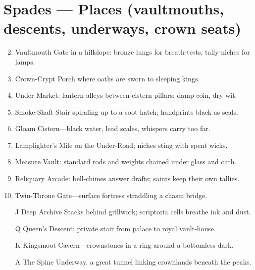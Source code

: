 \section{Spades --- Places (vaultmouths, descents, underways, crown seats)}
\label{sec:aeler-places}
\begin{enumerate}
\setcounter{enumi}{1}
\item Vaultmouth Gate in a hillslope: bronze lungs for breath-tests, tally-niches for lamps.
\item Crown-Crypt Porch where oaths are sworn to sleeping kings.
\item Under-Market: lantern alleys between cistern pillars; damp coin, dry wit.
\item Smoke-Shaft Stair spiraling up to a soot hatch; handprints black as seals.
\item Gloam Cistern---black water, lead scales, whispers carry too far.
\item Lamplighter's Mile on the Under-Road; niches sting with spent wicks.
\item Measure Vault: standard rods and weights chained under glass and oath.
\item Reliquary Arcade: bell-chimes answer drafts; saints keep their own tallies.
\item Twin-Throne Gate---surface fortress straddling a chasm bridge.
\item[J] Deep Archive Stacks behind grillwork; scriptoria cells breathe ink and dust.
\item[Q] Queen's Descent: private stair from palace to royal vault-house.
\item[K] Kingsmoot Cavern---crownstones in a ring around a bottomless dark.
\item[A] The Spine Underway, a great tunnel linking crownlands beneath the peaks.
\end{enumerate}

